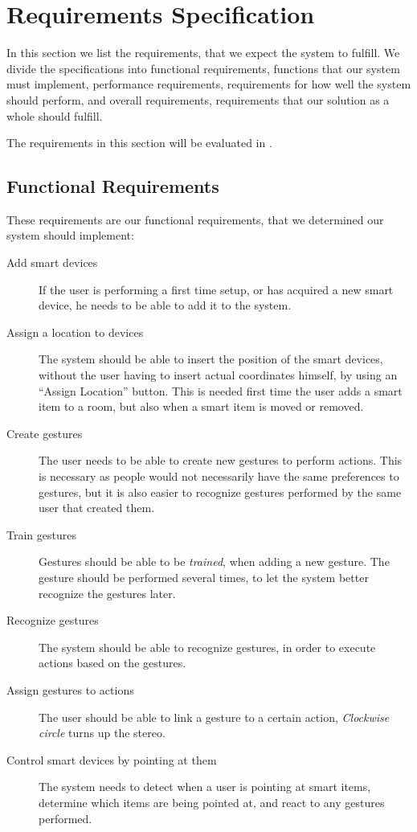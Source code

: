 \section{Requirements Specification}
\label{sec:requirements-specification}

In this section we list the requirements, 
that we expect the system to fulfill.
We divide the specifications into functional requirements, 
\ie functions that our system must implement,
performance requirements,
\ie requirements for how well the system should perform,
and overall requirements, 
\ie requirements that our solution as a whole should fulfill.

The requirements in this section will be evaluated in .

\subsection{Functional Requirements}
These requirements are our functional requirements, 
that we determined our system should implement:
\begin{description}
    \item[Add smart devices] If the user is performing a first time setup, or has acquired a new smart device, he needs to be able to add it to the system. 
    \item[Assign a location to devices] The system should be able to insert the position of the smart devices, without the user having to insert actual coordinates himself, \eg by using an ``Assign Location'' button. This is needed first time the user adds a smart item to a room, but also when a smart item is moved or removed.
    \item[Create gestures] The user needs to be able to create new gestures to perform actions. This is necessary as people would not necessarily have the same preferences to gestures, but it is also easier to recognize gestures performed by the same user that created them.
    \item[Train gestures] Gestures should be able to be \emph{trained}, \ie when adding a new gesture. The gesture should be performed several times, to let the system better recognize the gestures later.  
    \item[Recognize gestures] The system should be able to recognize gestures, in order to execute actions based on the gestures.
    \item[Assign gestures to actions] The user should be able to link a gesture to a certain action, \eg \textit{Clockwise circle} turns up the stereo.
    \item[Control smart devices by pointing at them] The system needs to detect when a user is pointing at smart items, determine which items are being pointed at, and react to any gestures performed.
\end{description}


